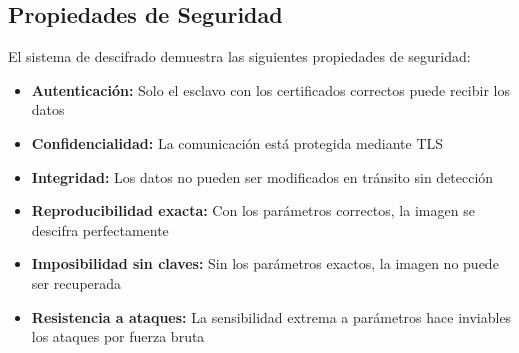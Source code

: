 \documentclass[12pt,a4paper]{article}
\begin{document}
	\subsection{Propiedades de Seguridad}
	
	El sistema de descifrado demuestra las siguientes propiedades de seguridad:
	
	\begin{itemize}
		\item \textbf{Autenticación:} Solo el esclavo con los certificados correctos puede recibir los datos
		
		\item \textbf{Confidencialidad:} La comunicación está protegida mediante TLS
		
		\item \textbf{Integridad:} Los datos no pueden ser modificados en tránsito sin detección
		
		\item \textbf{Reproducibilidad exacta:} Con los parámetros correctos, la imagen se descifra perfectamente
		
		\item \textbf{Imposibilidad sin claves:} Sin los parámetros exactos, la imagen no puede ser recuperada
		
		\item \textbf{Resistencia a ataques:} La sensibilidad extrema a parámetros hace inviables los ataques por fuerza bruta
	\end{itemize}
	
	
	
\end{document}
